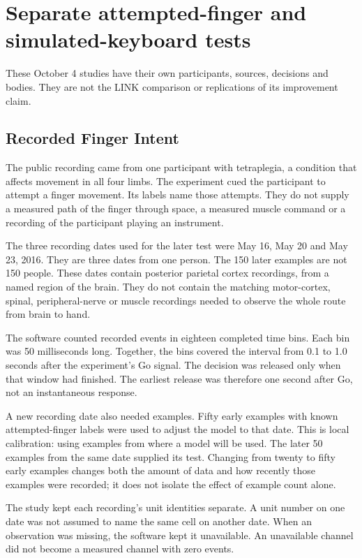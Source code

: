 \section{Separate attempted-finger and simulated-keyboard tests}

These October 4 studies have their own participants, sources, decisions and bodies. They are not the LINK comparison or replications of its improvement claim.

\subsection{Recorded Finger Intent}

The public recording came from one participant with tetraplegia, a condition
that affects movement in all four limbs. The experiment cued the participant to
attempt a finger movement. Its labels name those attempts. They do not supply a
measured path of the finger through space, a measured muscle command or a
recording of the participant playing an instrument.

The three recording dates used for the later test were May 16, May 20 and May
23, 2016. They are three dates from one person. The 150 later examples are not
150 people. These dates contain posterior parietal cortex recordings, from a
named region of the brain. They do not contain the matching motor-cortex,
spinal, peripheral-nerve or muscle recordings needed to observe the whole route
from brain to hand.

The software counted recorded events in eighteen completed time bins. Each bin
was 50 milliseconds long. Together, the bins covered the interval from 0.1 to
1.0 seconds after the experiment's Go signal. The decision was released only
when that window had finished. The earliest release was therefore one second
after Go, not an instantaneous response.

A new recording date also needed examples. Fifty early examples with known
attempted-finger labels were used to adjust the model to that date. This is
local calibration: using examples from where a model will be used. The later
50 examples from the same date supplied its test. Changing from twenty to fifty
early examples changes both the amount of data and how recently those examples
were recorded; it does not isolate the effect of example count alone.

The study kept each recording's unit identities separate. A unit number on one
date was not assumed to name the same cell on another date. When an observation
was missing, the software kept it unavailable. An unavailable channel did not
become a measured channel with zero events.

